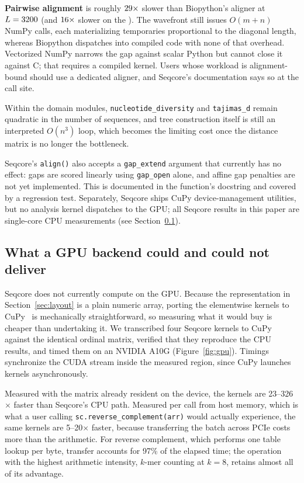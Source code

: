 \documentclass[10pt,letterpaper]{article}
\begin{document}
\textbf{Pairwise alignment} is roughly $29\times$ slower than Biopython's
aligner at $L=3200$\ifMultiMachine{} (and $16\times$
slower on the \OtherCPU)\fi. The wavefront still issues $O(m+n)$ NumPy calls, each materializing
temporaries proportional to the diagonal length, whereas Biopython dispatches
into compiled code with none of that overhead. Vectorized NumPy narrows the gap
against scalar Python but cannot close it against C; that requires a compiled
kernel. Users whose workload is alignment-bound should use a dedicated aligner,
and Seqcore's documentation says so at the call site.

Within the domain modules, \texttt{nucleotide\_diversity} and
\texttt{tajimas\_d} remain quadratic in the number of sequences, and tree
construction itself is still an interpreted $O(n^3)$ loop, which becomes the
limiting cost once the distance matrix is no longer the bottleneck.

Seqcore's \texttt{align()} also accepts a
\texttt{gap\_extend} argument that currently has no effect: gaps are scored
linearly using \texttt{gap\_open} alone, and affine gap penalties are not yet
implemented. This is documented in the function's docstring and covered by a
regression test. Separately, Seqcore ships CuPy
device-management utilities, but no analysis kernel dispatches to the GPU; all
Seqcore results in this paper are single-core CPU measurements
(see Section~\ref{sec:res:gpu}).

\subsection{What a GPU backend could and could not deliver}
\label{sec:res:gpu}

Seqcore does not currently compute on the GPU. Because the representation in
Section~\ref{sec:layout} is a plain numeric array, porting the elementwise
kernels to CuPy~\cite{okuta2017cupy} is mechanically straightforward, so
measuring what it would buy is cheaper than undertaking it. We
transcribed four Seqcore kernels to CuPy against the identical ordinal matrix,
verified that they reproduce the CPU results, and timed them on an NVIDIA A10G
(Figure~\ref{fig:gpu}). Timings synchronize the CUDA stream inside the measured
region, since CuPy launches kernels asynchronously.

Measured with the matrix already resident on the device, the kernels are 23--326$\times$ faster than
Seqcore's CPU path. Measured per call from host memory, which is what a user
calling \texttt{sc.reverse\_complement(arr)} would actually experience, the same
kernels are 5--20$\times$ faster, because transferring the batch across
PCIe costs more than the arithmetic. For reverse complement, which performs one
table lookup per byte, transfer accounts for 97\% of the elapsed time; the
operation with the highest arithmetic intensity, $k$-mer counting at $k=8$,
retains almost all of its advantage.
\end{document}
